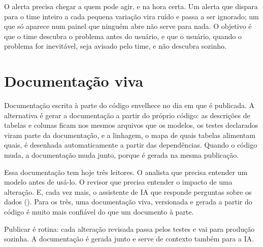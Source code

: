 O alerta precisa chegar a quem pode agir, e na hora certa. Um alerta que dispara para o time
inteiro a cada pequena variação vira ruído e passa a ser ignorado; um que só aparece num
painel que ninguém abre não serve para nada. O objetivo é que o time descubra o problema antes
do usuário, e que o usuário, quando o problema for inevitável, seja avisado pelo time, e não
descubra sozinho.

\section{Documentação viva}
\label{sec:documentacao}

Documentação escrita à parte do código envelhece no dia em que é publicada. A alternativa é
gerar a documentação a partir do próprio código: as descrições de tabelas e colunas ficam nos
mesmos arquivos que os modelos, os testes declarados viram parte da documentação, e a
linhagem, o mapa de quais tabelas alimentam quais, é desenhada automaticamente a partir das
dependências. Quando o código muda, a documentação muda junto, porque é gerada na mesma
publicação.

Essa documentação tem hoje três leitores. O analista que precisa entender um modelo antes de
usá-lo. O revisor que precisa entender o impacto de uma alteração. E, cada vez mais, o
assistente de IA que responde perguntas sobre os dados (). Para
os três, uma documentação viva, versionada e gerada a partir do código é muito mais confiável
do que um documento à parte.

{Publicar é rotina: cada alteração revisada passa pelos testes e vai para produção sozinha. A
documentação é gerada junto e serve de contexto também para a IA.}


\begin{leituras}
\end{leituras}
